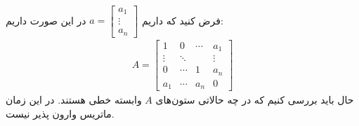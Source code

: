 \\
فرض کنید که داریم
$a = \begin{bmatrix}
    a_1 \\
    \vdots\\
    a_n
\end{bmatrix}$
در این صورت داریم:
\begin{gather*}
    A = \begin{bmatrix}
        1 & 0 & \cdots & a_1\\
        \vdots & \ddots &  & \vdots\\
        0 & \cdots & 1 & a_n\\
        a_1 & \cdots & a_n & 0
    \end{bmatrix}
\end{gather*}
حال باید بررسی کنیم که در چه حالاتی ستون‌های
$A$
وابسته خطی هستند. در این زمان ماتریس وارون پذیر نیست.
